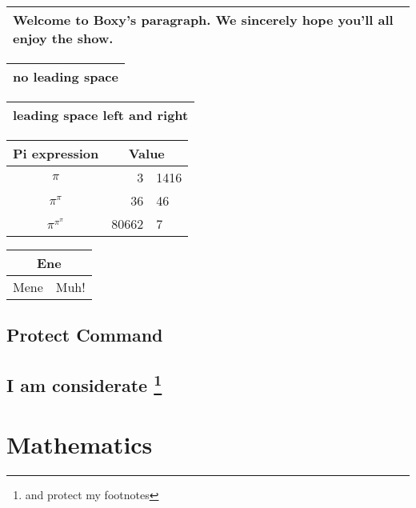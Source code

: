 \documentclass[a4paper,11pt]{article}
\begin{document}
\begin{tabular}{|p{4.7cm}|}
    \hline
    Welcome to Boxy's paragraph.
    We sincerely hope you'll
    all enjoy the show.\\
    \hline
\end{tabular}
\begin{tabular}{@{} l @{}}
    \hline
    no leading space\\
    \hline
\end{tabular}
\begin{tabular}{l}
    \hline
    leading space left and right\\
    \hline
\end{tabular}
\begin{tabular}{c r @{.} l}
    Pi expression &
    \multicolumn{2}{c}{Value} \\
    \hline
    $\pi$               & 3&1416    \\
    $\pi^{\pi}$         & 36&46     \\
    $\pi^{\pi^{\pi}}$   & 80662&7   \\
\end{tabular}
\begin{tabular}{|c|c|}
    \hline
    \multicolumn{2}{|c|}{Ene} \\
    \hline
    Mene & Muh! \\
    \hline
\end{tabular}
\subsection{Protect Command}
\subsection{I am considerate
\protect\footnote{and protect my footnotes}}

\section{Mathematics}
\end{document}
